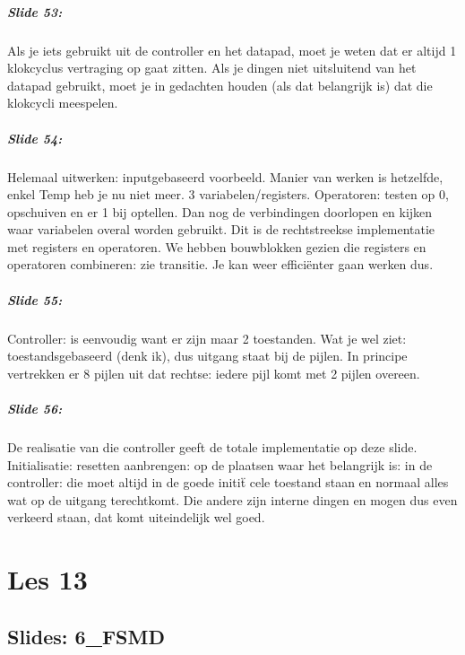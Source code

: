 \documentclass[10pt,a4paper]{book}
\begin{document}
\paragraph{Slide 53:} Als je iets gebruikt uit de controller en het datapad, moet je weten dat er altijd 1 klokcyclus vertraging op gaat zitten. Als je dingen niet uitsluitend van het datapad gebruikt, moet je in gedachten houden (als dat belangrijk is) dat die klokcycli meespelen.

\paragraph{Slide 54:} Helemaal uitwerken: inputgebaseerd voorbeeld. Manier van werken is hetzelfde, enkel Temp heb je nu niet meer. 3 variabelen/registers. Operatoren: testen op 0, opschuiven en er 1 bij optellen. Dan nog de verbindingen doorlopen en kijken waar variabelen overal worden gebruikt. Dit is de rechtstreekse implementatie met registers en operatoren. We hebben bouwblokken gezien die registers en operatoren combineren: zie transitie. Je kan weer effici\"enter gaan werken dus.

\paragraph{Slide 55:} Controller: is eenvoudig want er zijn maar 2 toestanden. Wat je wel ziet: toestandsgebaseerd (denk ik), dus uitgang staat bij de pijlen. In principe vertrekken er 8 pijlen uit dat rechtse: iedere pijl komt met 2 pijlen overeen. 

\paragraph{Slide 56:} De realisatie van die controller geeft de totale implementatie op deze slide.
Initialisatie: resetten aanbrengen: op de plaatsen waar het belangrijk is: in de controller: die moet altijd in de goede initi\"t cele toestand staan en normaal alles wat op de uitgang terechtkomt. Die andere zijn interne dingen en mogen dus even verkeerd staan, dat komt uiteindelijk wel goed. 

\chapter{Les 13}

\section{Slides: 6\_FSMD}
\end{document}
